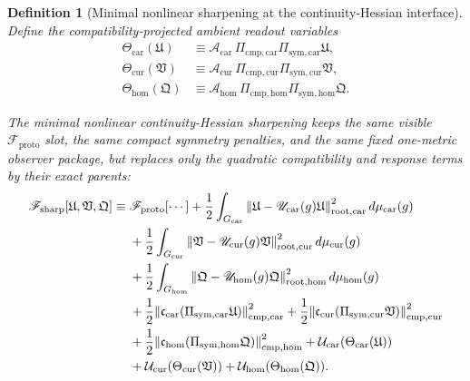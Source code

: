 \documentclass[11pt]{article}
\newcommand{\ProtoFunctional}{\mathscr F_{\mathrm{proto}}}
\newcommand{\SharpFunctional}{\mathscr F_{\mathrm{sharp}}}
\newcommand{\RootTensor}{\mathfrak U}
\newcommand{\RootRelabel}{\mathfrak V}
\newcommand{\RootFree}{\mathfrak Q}
\newcommand{\TensorSymProj}{\Pi_{\mathrm{sym,car}}}
\newcommand{\CurSymProj}{\Pi_{\mathrm{sym,cur}}}
\newcommand{\HomSymProj}{\Pi_{\mathrm{sym,hom}}}
\newcommand{\TensorSymGroup}{G_{\mathrm{car}}}
\newcommand{\CurSymGroup}{G_{\mathrm{cur}}}
\newcommand{\HomSymGroup}{G_{\mathrm{hom}}}
\newcommand{\TensorSymAct}{\mathscr U_{\mathrm{car}}}
\newcommand{\CurSymAct}{\mathscr U_{\mathrm{cur}}}
\newcommand{\HomSymAct}{\mathscr U_{\mathrm{hom}}}
\newcommand{\TensorCmpProj}{\Pi_{\mathrm{cmp,car}}}
\newcommand{\CurCmpProj}{\Pi_{\mathrm{cmp,cur}}}
\newcommand{\HomCmpProj}{\Pi_{\mathrm{cmp,hom}}}
\newcommand{\TensorCurrent}{\mathfrak c_{\mathrm{car}}}
\newcommand{\CurCurrent}{\mathfrak c_{\mathrm{cur}}}
\newcommand{\HomCurrent}{\mathfrak c_{\mathrm{hom}}}
\newcommand{\TensorEqRead}{\mathcal A_{\mathrm{car}}}
\newcommand{\CurEqRead}{\mathcal A_{\mathrm{cur}}}
\newcommand{\HomEqRead}{\mathcal A_{\mathrm{hom}}}
\newcommand{\TensorAmbientEnergy}{\mathcal U_{\mathrm{car}}}
\newcommand{\CurAmbientEnergy}{\mathcal U_{\mathrm{cur}}}
\newcommand{\HomAmbientEnergy}{\mathcal U_{\mathrm{hom}}}
\newcommand{\TensorTheta}{\Theta_{\mathrm{car}}}
\newcommand{\CurTheta}{\Theta_{\mathrm{cur}}}
\newcommand{\HomTheta}{\Theta_{\mathrm{hom}}}
\newtheorem{definition}{Definition}
\begin{document}
\begin{definition}[Minimal nonlinear sharpening at the continuity-Hessian interface]
\label{def:sharp}
Define the compatibility-projected ambient readout variables
\begin{equation}
\begin{aligned}
\TensorTheta(\RootTensor)
&\equiv
\TensorEqRead\,\TensorCmpProj\TensorSymProj\RootTensor,
\\
\CurTheta(\RootRelabel)
&\equiv
\CurEqRead\,\CurCmpProj\CurSymProj\RootRelabel,
\\
\HomTheta(\RootFree)
&\equiv
\HomEqRead\,\HomCmpProj\HomSymProj\RootFree.
\end{aligned}
\label{eq:theta}
\end{equation}

The \emph{minimal nonlinear continuity-Hessian sharpening} keeps the same visible \(\ProtoFunctional\) slot, the same compact symmetry penalties, and the same fixed one-metric observer package, but replaces only the quadratic compatibility and response terms by their exact parents:
\begin{equation}
\begin{aligned}
\SharpFunctional[\RootTensor,\RootRelabel,\RootFree]
\equiv\;
&\ProtoFunctional[\cdots]
+\frac12\int_{\TensorSymGroup}
\norm{\RootTensor-\TensorSymAct(g)\RootTensor}_{\mathrm{root,car}}^2\,
d\mu_{\mathrm{car}}(g)
\\
&+\frac12\int_{\CurSymGroup}
\norm{\RootRelabel-\CurSymAct(g)\RootRelabel}_{\mathrm{root,cur}}^2\,
d\mu_{\mathrm{cur}}(g)
\\
&+\frac12\int_{\HomSymGroup}
\norm{\RootFree-\HomSymAct(g)\RootFree}_{\mathrm{root,hom}}^2\,
d\mu_{\mathrm{hom}}(g)
\\
&+\frac12\norm{\TensorCurrent(\TensorSymProj\RootTensor)}_{\mathrm{cmp,car}}^2
+\frac12\norm{\CurCurrent(\CurSymProj\RootRelabel)}_{\mathrm{cmp,cur}}^2
\\
&+\frac12\norm{\HomCurrent(\HomSymProj\RootFree)}_{\mathrm{cmp,hom}}^2
+\TensorAmbientEnergy(\TensorTheta(\RootTensor))
\\
&+\CurAmbientEnergy(\CurTheta(\RootRelabel))
+\HomAmbientEnergy(\HomTheta(\RootFree)).
\end{aligned}
\label{eq:Fsharp}
\end{equation}
\end{definition}
\end{document}
